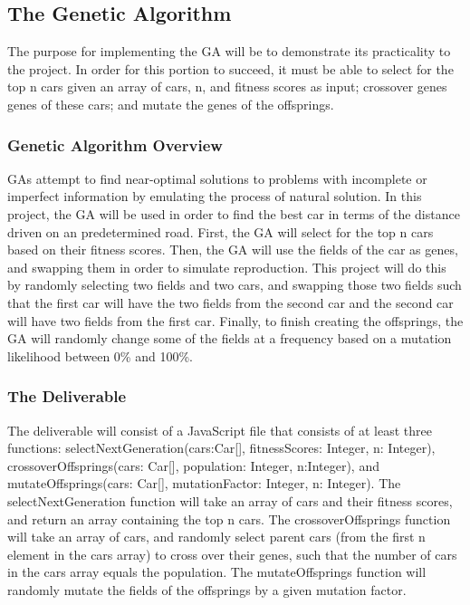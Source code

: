 \documentclass{article}
\begin{document}
\subsection{The Genetic Algorithm}
The purpose for implementing the GA will be to demonstrate its practicality to 
the project. In order for this portion to succeed, it must be able to select for 
the top n cars given an array of cars, n, and fitness scores as input; crossover 
genes genes of these cars; and mutate the genes of the offsprings.

\subsubsection{Genetic Algorithm Overview}
GAs attempt to find near-optimal solutions to problems with incomplete or 
imperfect information by emulating the process of natural solution. In this 
project, the GA will be used in order to find the best car in terms of the 
distance driven on an predetermined road. First, the GA will select for the top 
n cars based on their fitness scores. Then, the GA will use the fields of the 
car as genes, and swapping them in order to simulate reproduction. This project 
will do this by randomly selecting two fields and two cars, and swapping those 
two fields such that the first car will have the two fields from the second car 
and the second car will have two fields from the first car. Finally, to finish 
creating the offsprings, the GA will randomly change some of the fields at a 
frequency based on a mutation likelihood between 0\% and 100\%. 

\subsubsection{The Deliverable}
The deliverable will consist of a JavaScript file that consists of at least 
three functions: selectNextGeneration(cars:Car[], fitnessScores: Integer, n: 
Integer), crossoverOffsprings(cars: Car[], population: Integer, n:Integer), and 
mutateOffsprings(cars: Car[], mutationFactor: Integer, n: Integer). The 
selectNextGeneration function will take an array of cars and their fitness 
scores, and return an array containing the top n cars. The crossoverOffsprings 
function will take an array of cars, and randomly select parent cars (from the 
first n element in the cars array) to cross over their genes, such that the 
number of cars in the cars array equals the population. The mutateOffsprings 
function will randomly mutate the fields of the offsprings by a given mutation 
factor.
\end{document}
